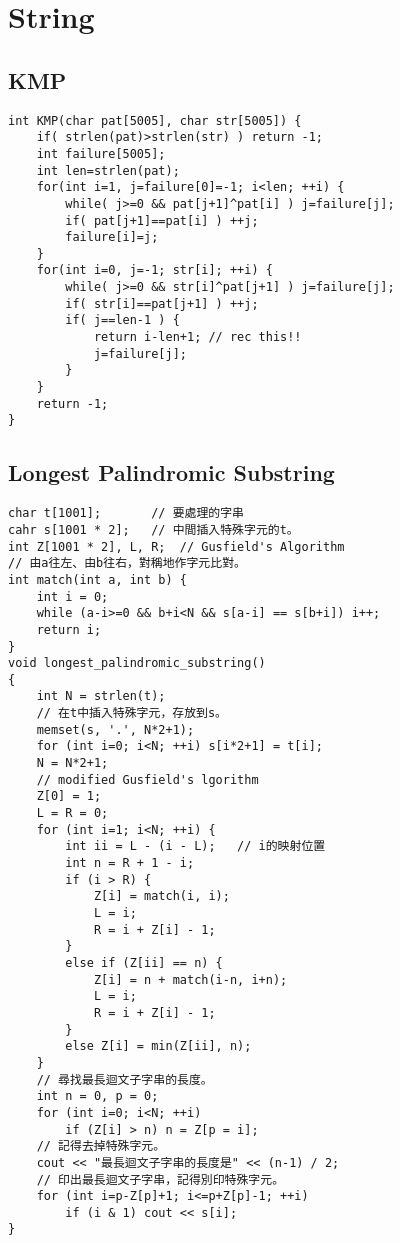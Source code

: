 \documentclass[11pt,twocolumn,a4paper]{article}
\begin{document}

\newpage
\section{String}
\subsection{KMP}
\begin{lstlisting}[label=KMP]
int KMP(char pat[5005], char str[5005]) {
	if( strlen(pat)>strlen(str) ) return -1;
	int failure[5005];
	int len=strlen(pat);
	for(int i=1, j=failure[0]=-1; i<len; ++i) {
		while( j>=0 && pat[j+1]^pat[i] ) j=failure[j];
		if( pat[j+1]==pat[i] ) ++j;
		failure[i]=j;
	}
	for(int i=0, j=-1; str[i]; ++i) {
		while( j>=0 && str[i]^pat[j+1] ) j=failure[j];
		if( str[i]==pat[j+1] ) ++j;
		if( j==len-1 ) {
			return i-len+1; // rec this!!
			j=failure[j];
		}
	}
	return -1;
}
\end{lstlisting}

\subsection{Longest Palindromic Substring}
\begin{lstlisting}[label=Longest Palindromic Substring]
char t[1001];		// 要處理的字串
cahr s[1001 * 2];	// 中間插入特殊字元的t。
int Z[1001 * 2], L, R;	// Gusfield's Algorithm
// 由a往左、由b往右，對稱地作字元比對。
int match(int a, int b) {
	int i = 0;
	while (a-i>=0 && b+i<N && s[a-i] == s[b+i]) i++;
	return i;
}
void longest_palindromic_substring()
{
	int N = strlen(t);
	// 在t中插入特殊字元，存放到s。
	memset(s, '.', N*2+1);
	for (int i=0; i<N; ++i) s[i*2+1] = t[i];
	N = N*2+1;
	// modified Gusfield's lgorithm
	Z[0] = 1;
	L = R = 0;
	for (int i=1; i<N; ++i) {
		int ii = L - (i - L);   // i的映射位置
		int n = R + 1 - i;
		if (i > R) {
			Z[i] = match(i, i);
			L = i;
			R = i + Z[i] - 1;
		}
		else if (Z[ii] == n) {
			Z[i] = n + match(i-n, i+n);
			L = i;
			R = i + Z[i] - 1;
		}
		else Z[i] = min(Z[ii], n);
	}
	// 尋找最長迴文子字串的長度。
	int n = 0, p = 0;
	for (int i=0; i<N; ++i)
		if (Z[i] > n) n = Z[p = i];
	// 記得去掉特殊字元。
	cout << "最長迴文子字串的長度是" << (n-1) / 2;
	// 印出最長迴文子字串，記得別印特殊字元。
	for (int i=p-Z[p]+1; i<=p+Z[p]-1; ++i)
		if (i & 1) cout << s[i];
}
\end{lstlisting}
\end{document}
